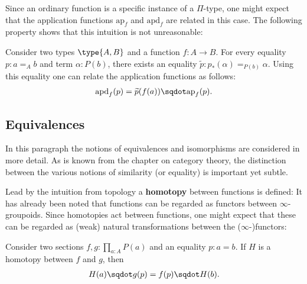     Since an ordinary function is a specific instance of a $\Pi$-type, one might expect that the application functions $\text{ap}_f$ and $\text{apd}_f$ are related in this case. The following property shows that this intuition is not unreasonable:
    \begin{property}
        Consider two types $\type{A,B}$ and a function $f:A\rightarrow B$. For every equality $p:a=_Ab$ and term $\alpha:P(b)$, there exists an equality $\widetilde{p}:p_*(\alpha)=_{P(b)}\alpha$. Using this equality one can relate the application functions as follows:
        \begin{gather}
            \text{apd}_f(p) = \widetilde{p}(f(a))\sqdot\text{ap}_f(p).
        \end{gather}
    \end{property}

\subsection{Equivalences}

    In this paragraph the notions of equivalences and isomorphisms are considered in more detail. As is known from the chapter on category theory, the distinction between the various notions of similarity (or equality) is important yet subtle.

    Lead by the intuition from topology a \textbf{homotopy} between functions is defined:
    It has already been noted that functions can be regarded as functors between $\infty$-groupoids. Since homotopies act between functions, one might expect that these can be regarded as (weak) natural transformations between the ($\infty$-)functors:
    \begin{property}
        Consider two sections $f,g:\prod_{a:A}P(a)$ and an equality $p:a=b$. If $H$ is a homotopy between $f$ and $g$, then
        \begin{gather}
            H(a)\sqdot g(p) = f(p)\sqdot H(b).
        \end{gather}
    \end{property}

